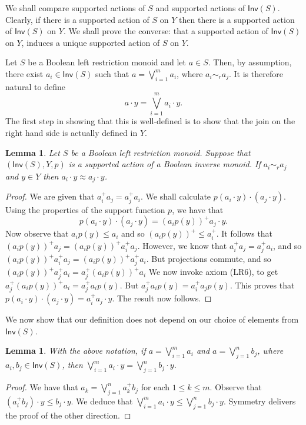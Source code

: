 \documentclass[a4paper]{amsart}
\newtheorem{lemma}[theorem]{Lemma}
\begin{document}
We shall compare supported actions of $S$ and supported actions of $\mathsf{Inv}(S)$.
Clearly, if there is a supported action of $S$ on $Y$ then there is a supported action of 
$\mathsf{Inv}(S)$ on $Y$.
We shall prove  the converse: that a supported action of $\mathsf{Inv}(S)$ on $Y$, induces a unique supported action of
$S$ on $Y$.

Let $S$ be a Boolean left restriction monoid and let $a \in S$.
Then, by assumption, there exist $a_{i} \in \mathsf{Inv}(S)$ such that
$a = \bigvee_{i=1}^{m} a_{i}$, where $a_{i} \sim_{r} a_{j}$.
It is therefore natural to define
$$a \cdot y = \bigvee_{i=1}^{m} a_{i} \cdot y.$$
The first step in showing that this is well-defined is to show that the join on the right hand side is actually defined in $Y$.

\begin{lemma}\label{lem:alice} Let $S$ be a Boolean left restriction monoid.
Suppose that $(\mathsf{Inv}(S),Y,p)$ is a supported action of a Boolean inverse monoid.
If $a_{i} \sim_{r} a_{j}$ and $y \in Y$ then $a_{i} \cdot y \approx a_{j} \cdot y$.
\end{lemma}
\begin{proof} We are given that $a_{i}^{+}a_{j} = a_{j}^{+}a_{i}$.
We shall calculate $p(a_{i} \cdot y) \cdot (a_{j} \cdot y)$.
Using the properties of the support function $p$, we have that
$$p(a_{i} \cdot y) \cdot (a_{j} \cdot y)
= 
(a_{i}p(y))^{+}a_{j} \cdot y.$$
Now observe that $a_{i}p(y) \leq a_{i}$ and so
$(a_{i}p(y))^{+} \leq a_{i}^{+}$.
It follows that
$(a_{i}p(y))^{+}a_{j} = (a_{i}p(y))^{+}a_{i}^{+}a_{j}$.
However, we know that $a_{i}^{+}a_{j} = a_{j}^{+}a_{i}$, 
and so
$(a_{i}p(y))^{+}a_{i}^{+}a_{j}
=
(a_{i}p(y))^{+}a_{j}^{+}a_{i}$.
But projections commute, and so
$(a_{i}p(y))^{+}a_{j}^{+}a_{i}
=
a_{j}^{+}(a_{i}p(y))^{+}a_{i}$
We now invoke axiom (LR6), to get
$a_{j}^{+}(a_{i}p(y))^{+}a_{i}
= 
a_{j}^{+}a_{i}p(y)$.
But $a_{j}^{+}a_{i}p(y) = a_{i}^{+}a_{j}p(y)$.
This proves that $p(a_{i} \cdot y) \cdot (a_{j} \cdot y) = a_{i}^{+}a_{j} \cdot y$.
The result now follows.
\end{proof}

We now show that our definition does not depend on our choice of elements from $\mathsf{Inv}(S)$.

\begin{lemma} With the above notation, if $a = \bigvee_{i=1}^{m} a_{i}$ and $a = \bigvee_{j = 1}^{n} b_{j}$,
where $a_{i}, b_{j} \in \mathsf{Inv}(S)$,
then $\bigvee_{i=1}^{m} a_{i} \cdot y = \bigvee_{j=1}^{n} b_{j} \cdot y$.
\end{lemma}
\begin{proof} We have that $a_{k} = \bigvee_{j=1}^{n} a_{k}^{+}b_{j}$ for each $1 \leq k \leq m$.
Observe that $(a_{i}^{+}b_{j}) \cdot y \leq b_{j} \cdot y$.
We deduce that $\bigvee_{i=1}^{m} a_{i} \cdot y \leq \bigvee_{j=1}^{n} b_{j} \cdot y$.
Symmetry delivers the proof of the other direction.
\end{proof}
\end{document}
